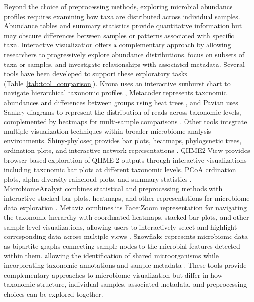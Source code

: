 Beyond the choice of preprocessing methods, exploring microbial abundance profiles requires examining how taxa are distributed across individual samples. Abundance tables and summary statistics provide quantitative information but may obscure differences between samples or patterns associated with specific taxa. Interactive visualization offers a complementary approach by allowing researchers to progressively explore abundance distributions, focus on subsets of taxa or samples, and investigate relationships with associated metadata. Several tools have been developed to support these exploratory tasks (Table~\ref{tab:tool_comparison}). Krona uses an interactive sunburst chart to navigate hierarchical taxonomic profiles \cite{ondov_interactive_2011}, Metacoder represents taxonomic abundances and differences between groups using heat trees \cite{foster_metacoder_2017}, and Pavian uses Sankey diagrams to represent the distribution of reads across taxonomic levels, complemented by heatmaps for multi-sample comparisons \cite{breitwieser_pavian_2020}. Other tools integrate multiple visualization techniques within broader microbiome analysis environments. Shiny-phyloseq provides bar plots, heatmaps, phylogenetic trees, ordination plots, and interactive network representations \cite{mcmurdie_shiny-phyloseq_2015}. QIIME2 View provides browser-based exploration of QIIME 2 outputs through interactive visualizations including taxonomic bar plots at different taxonomic levels, PCoA ordination plots, alpha-diversity raincloud plots, and summary statistics \cite{bolyen_reproducible_2019}. MicrobiomeAnalyst combines statistical and preprocessing methods with interactive stacked bar plots, heatmaps, and other representations for microbiome data exploration \cite{lu_microbiomeanalyst_2023}. Metaviz combines its FacetZoom representation for navigating the taxonomic hierarchy with coordinated heatmaps, stacked bar plots, and other sample-level visualizations, allowing users to interactively select and highlight corresponding data across multiple views \cite{wagner_metaviz_2018}. Snowflake represents microbiome data as bipartite graphs connecting sample nodes to the microbial features detected within them, allowing the identification of shared microorganisms while incorporating taxonomic annotations and sample metadata \cite{peeters_snowflake_2024}. These tools provide complementary approaches to microbiome visualization but differ in how taxonomic structure, individual samples, associated metadata, and preprocessing choices can be explored together.

